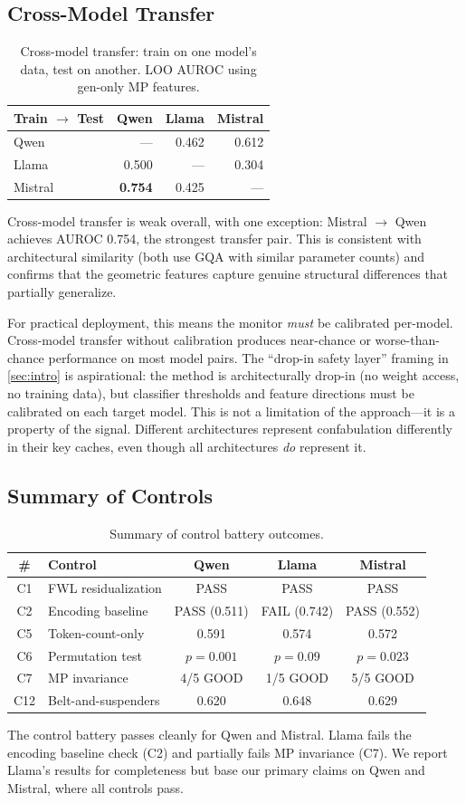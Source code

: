 \subsection{Cross-Model Transfer}

\begin{table}[H]
\centering
\caption{Cross-model transfer: train on one model's data, test on another.
  LOO AUROC using gen-only MP features.}
\label{tab:transfer}
\begin{tabular}{lrrr}
\toprule
Train $\to$ Test & Qwen & Llama & Mistral \\
\midrule
Qwen    & --- & 0.462 & 0.612 \\
Llama   & 0.500 & --- & 0.304 \\
Mistral & \textbf{0.754} & 0.425 & --- \\
\bottomrule
\end{tabular}
\end{table}

Cross-model transfer is weak overall, with one exception:
Mistral $\to$ Qwen achieves AUROC 0.754, the strongest transfer pair.
This is consistent with architectural similarity (both use GQA with
similar parameter counts) and confirms that the geometric features
capture genuine structural differences that partially generalize.

For practical deployment, this means the monitor \emph{must} be
calibrated per-model. Cross-model transfer without calibration produces
near-chance or worse-than-chance performance on most model pairs. The
``drop-in safety layer'' framing in \cref{sec:intro} is aspirational:
the method is architecturally drop-in (no weight access, no training
data), but classifier thresholds and feature directions must be
calibrated on each target model. This is not a limitation of the
approach---it is a property of the signal. Different architectures
represent confabulation differently in their key caches, even though
all architectures \emph{do} represent it.

\subsection{Summary of Controls}

\begin{table}[H]
\centering
\caption{Summary of control battery outcomes.}
\label{tab:control_summary}
\begin{tabular}{clccc}
\toprule
\# & Control & Qwen & Llama & Mistral \\
\midrule
C1 & FWL residualization & PASS & PASS & PASS \\
C2 & Encoding baseline & PASS (0.511) & FAIL (0.742) & PASS (0.552) \\
C5 & Token-count-only & 0.591 & 0.574 & 0.572 \\
C6 & Permutation test & $p{=}0.001$ & $p{=}0.09$ & $p{=}0.023$ \\
C7 & MP invariance & 4/5 GOOD & 1/5 GOOD & 5/5 GOOD \\
C12 & Belt-and-suspenders & 0.620 & 0.648 & 0.629 \\
\bottomrule
\end{tabular}
\end{table}

The control battery passes cleanly for Qwen and Mistral. Llama fails the
encoding baseline check (C2) and partially fails MP invariance (C7). We
report Llama's results for completeness but base our primary claims on
Qwen and Mistral, where all controls pass.
